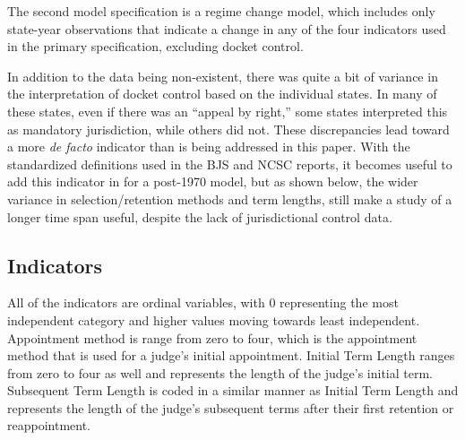\documentclass[12pt]{article}
\begin{document}
The second model specification is a regime change model, which includes only state-year observations that indicate a change in any of the four indicators used in the primary specification, excluding docket control.  

In addition to the data being non-existent, there was quite a bit of variance in the interpretation of docket control based on the individual states.  In many of these states, even if there was an ``appeal by right,'' some states interpreted this as mandatory jurisdiction, while others did not.  These discrepancies lead toward a more \textit{de facto} indicator than is being addressed in this paper.  With the standardized definitions used in the BJS and NCSC reports, it becomes useful to add this indicator in for a post-1970 model, but as shown below, the wider variance in selection/retention methods and term lengths, still make a study of a longer time span useful, despite the lack of jurisdictional control data.  

\subsection*{Indicators}
All of the indicators are ordinal variables, with 0 representing the most independent category and higher values moving towards least independent.  Appointment method is range from zero to four, which is the appointment method that is used for a judge's initial appointment.  Initial Term Length ranges from zero to four as well and represents the length of the judge's initial term.  Subsequent Term Length is coded in a similar manner as Initial Term Length and represents the length of the judge's subsequent terms after their first retention or reappointment. 
\end{document}
